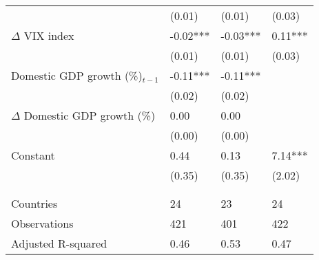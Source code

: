 {\begin{tabular}{lp{2cm}p{2cm}p{2cm}}
   & (0.01) & (0.01) & (0.03) \\ 
  $\Delta$ VIX index & -0.02*** & -0.03*** & 0.11*** \\ 
   & (0.01) & (0.01) & (0.03) \\ 
  Domestic GDP growth (\%)$_{t-1}$ & -0.11*** & -0.11*** &  \\ 
   & (0.02) & (0.02) &  \\ 
  $\Delta$ Domestic GDP growth (\%) & 0.00 & 0.00 &  \\ 
   & (0.00) & (0.00) &  \\ 
  Constant & 0.44 & 0.13 & 7.14*** \\ 
   & (0.35) & (0.35) & (2.02) \\ 
   &  &  &  \\ 
   &  &  &  \\ 
  Countries & 24 & 23 & 24 \\ 
  Observations & 421 & 401 & 422 \\ 
  Adjusted R-squared & 0.46 & 0.53 & 0.47 \\ 
   \hline
\end{tabular}
}
